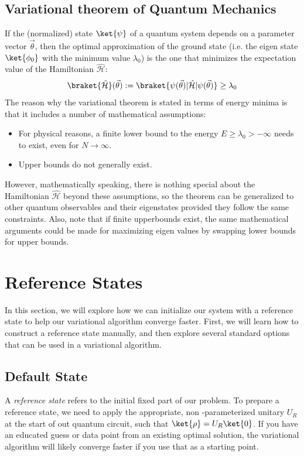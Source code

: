 \documentclass[12pt, oneside]{book}
\theoremstyle{definition}
\theoremstyle{definition}
\theoremstyle{remark}
\begin{document}
\subsection{Variational theorem of Quantum Mechanics}
If the (normalized) state $\ket{\psi}$ of a quantum system depends on a parameter vector $\vec{\theta}$, then the optimal approximation of the ground state (i.e. the eigen state $\ket{\phi_0}$ with the minimum value $\lambda_0$) is the one that minimizes the expectation value of the Hamiltonian $\hat{\mathcal{H}}$:
\[
\braket{\hat{\mathcal{H}}}(\vec{\theta}):=\braket{\psi(\vec{\theta})|\hat{\mathcal{H}}|\psi(\vec{\theta})} \geq \lambda_0
\]
The reason why the variational theorem is stated in terms of energy minima is that it includes a number of mathematical assumptions:
\begin{itemize}
    \item For physical reasons, a finite lower bound to the energy $E\geq \lambda_0>-\infty$ needs to exist, even for $N\rightarrow \infty$.
    \item Upper bounds do not generally exist.
\end{itemize}
However, mathematically speaking, there is nothing special about the Hamiltonian $\hat{\mathcal{H}}$ beyond these assumptions, so the theorem can be generalized to other quantum observables and their eigenstates provided they follow the same constraints. Also, note that if finite upperbounds exist, the same mathematical arguments could be made for maximizing eigen values by swapping lower bounds for upper bounds.

\section{Reference States}
In this section, we will explore how we can initialize our system with a reference state to help our variational algorithm converge faster. First, we will learn how to construct a reference state manually, and then explore several standard options that can be used in a variational algorithm.

\subsection{Default State}
A \textit{reference state} refers to the initial fixed part of our problem. To prepare a reference state, we need to apply the appropriate, non -parameterized unitary $U_R$ at the start of out quantum circuit, such that $\ket{\rho}=U_R\ket{0}$. If you have an educated guess or data point from an existing optimal solution, the variational algorithm will likely converge faster if you use that as a starting point.
\end{document}
